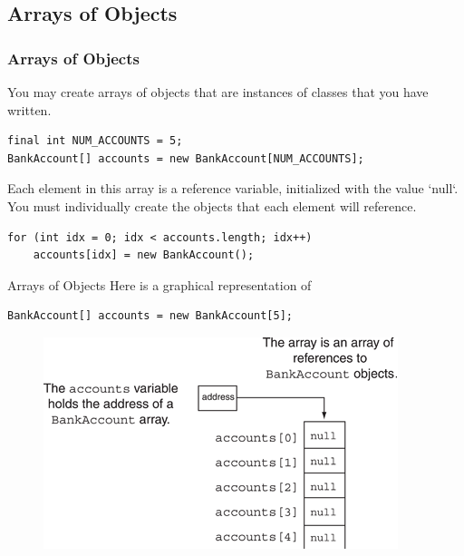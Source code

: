 \documentclass[11pt]{beamer}
\begin{document}
\subsection{Arrays of Objects}
\begin{frame}[fragile]
    \frametitle{Arrays of Objects}
    You may create arrays of objects that are instances of classes that you have written.
    \begin{lstlisting}
final int NUM_ACCOUNTS = 5;
BankAccount[] accounts = new BankAccount[NUM_ACCOUNTS];
    \end{lstlisting}
    Each element in this array is a reference variable, initialized with the value `null`. You must individually create the objects that each element will reference.
    \begin{lstlisting}
for (int idx = 0; idx < accounts.length; idx++)
    accounts[idx] = new BankAccount();
    \end{lstlisting}
\end{frame}

\begin{frame}[fragile]{Arrays of Objects}
Here is a graphical representation of
\begin{lstlisting}
BankAccount[] accounts = new BankAccount[5];
\end{lstlisting}
    \noindent 
    \begin{figure}[H]
    \centering
    \includegraphics[scale=0.8]{Images/chapter07_section06_fig16.png}
    \end{figure}   
\end{frame}
\end{document}
